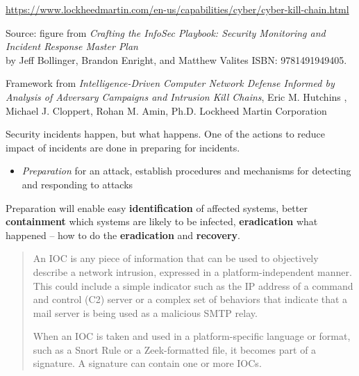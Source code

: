 \documentclass[Screen16to9,17pt]{foils}
\begin{document}
\url{https://www.lockheedmartin.com/en-us/capabilities/cyber/cyber-kill-chain.html}




\begin{list2}
\item  Source: figure from \emph{Crafting the InfoSec Playbook: Security Monitoring and Incident Response Master Plan}\\ by Jeff Bollinger, Brandon Enright, and Matthew Valites ISBN: 9781491949405.
\item Framework from \emph{Intelligence-Driven Computer Network Defense Informed by Analysis of Adversary Campaigns and Intrusion Kill Chains}, Eric M. Hutchins , Michael J. Cloppert, Rohan M. Amin, Ph.D. Lockheed Martin Corporation\\{\footnotesize
 }
\end{list2}





Security incidents happen, but what happens. One of the actions to reduce impact of incidents are done in preparing for incidents.

\begin{itemize}
\item \emph{Preparation} for an attack, establish procedures and mechanisms for detecting and responding to attacks
\end{itemize}

Preparation will enable easy {\bf identification} of affected systems, better {\bf containment} which systems are likely to be infected, {\bf eradication} what happened -- how to do the {\bf eradication} and {\bf recovery}.




\begin{quote}
An IOC is any piece of information that can be used to objectively describe a network intrusion, expressed in a platform-independent manner. This could include a simple indicator such as the IP address of a command and control (C2) server or a complex set of behaviors that indicate that a mail server is being used as a malicious SMTP relay.

When an IOC is taken and used in a platform-specific language or format, such as a Snort Rule or a Zeek-formatted file, it becomes part of a signature. A signature can contain one or more IOCs.
\end{quote}
\end{document}
